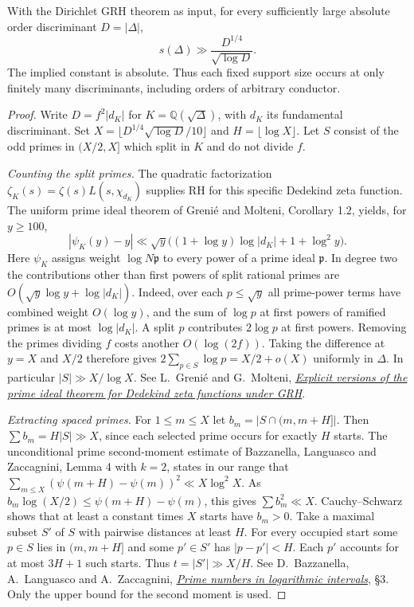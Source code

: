 \begin{theorem}
With the Dirichlet GRH theorem as input, for every sufficiently large
absolute order discriminant $D=|\Delta|$,
\[
                  s(\Delta)\gg\frac{D^{1/4}}{\sqrt{\log D}} .
\]
The implied constant is absolute. Thus each fixed support size occurs at
only finitely many discriminants, including orders of arbitrary conductor.
\end{theorem}
\begin{proof}
Write $D=f^2|d_K|$ for $K=\mathbb Q(\sqrt\Delta)$, with $d_K$ its
fundamental discriminant. Set
$X=\lfloor D^{1/4}\sqrt{\log D}/10\rfloor$ and
$H=\lfloor\log X\rfloor$. Let $S$ consist of the odd primes in $(X/2,X]$
which split in $K$ and do not divide $f$.

\emph{Counting the split primes.}
The quadratic factorization $\zeta_K(s)=\zeta(s)L(s,\chi_{d_K})$
supplies RH for this specific Dedekind zeta function. The uniform prime
ideal theorem of Greni\'e and Molteni, Corollary 1.2, yields, for $y\ge100$,
\[
  |\psi_K(y)-y|
   \ll\sqrt y\big((1+\log y)\log |d_K|+1+\log^2y\big).
\]
Here $\psi_K$ assigns weight $\log N\mathfrak p$ to every power of a prime
ideal $\mathfrak p$. In degree two the contributions other than first powers
of split rational primes are $O(\sqrt y\log y+\log|d_K|)$.
Indeed, over each $p\le\sqrt y$ all prime-power terms have combined
weight $O(\log y)$, and the sum of $\log p$ at first powers of ramified
primes is at most $\log|d_K|$. A split $p$ contributes $2\log p$ at first
powers. Removing the primes dividing $f$ costs another $O(\log(2f))$.
Taking the difference at $y=X$ and $X/2$ therefore gives
$2\sum_{p\in S}\log p=X/2+o(X)$ uniformly in $\Delta$.
In particular $|S|\gg X/\log X$.
See L.~Greni\'e and G.~Molteni,
\href{https://arxiv.org/pdf/1312.4463}{\emph{Explicit versions of the
prime ideal theorem for Dedekind zeta functions under GRH}}.

\emph{Extracting spaced primes.}
For $1\le m\le X$ let $b_m=|S\cap(m,m+H]|$.
Then $\sum b_m=H|S|\gg X$, since each selected prime occurs for exactly
$H$ starts. The unconditional prime second-moment estimate of
Bazzanella, Languasco and Zaccagnini, Lemma 4 with $k=2$, states in our
range that $\sum_{m\le X}(\psi(m+H)-\psi(m))^2\ll X\log^2X$.
As $b_m\log(X/2)\le\psi(m+H)-\psi(m)$, this gives $\sum b_m^2\ll X$.
Cauchy--Schwarz shows that at least a constant times $X$ starts have
$b_m>0$. Take a maximal subset $S'$ of $S$ with pairwise distances at
least $H$. For every occupied start some $p\in S$ lies in $(m,m+H]$
and some $p'\in S'$ has $|p-p'|<H$. Each $p'$ accounts for at most
$3H+1$ such starts. Thus $t=|S'|\gg X/H$.
See D.~Bazzanella, A.~Languasco and A.~Zaccagnini,
\href{https://arxiv.org/pdf/0809.2967}{\emph{Prime numbers in logarithmic
intervals}}, \S3. Only the upper bound for the second moment is used.


\end{proof}
